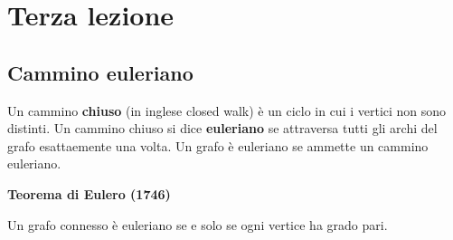 \documentclass[12pt]{report}
\begin{document}
\chapter{Terza lezione}

\section{Cammino euleriano}

\noindent
Un cammino \textbf{chiuso} (in inglese closed walk) è un ciclo in cui i vertici non sono distinti. Un cammino chiuso si dice \textbf{euleriano} se attraversa tutti gli archi del grafo esattaemente una volta. Un grafo è euleriano se ammette un cammino euleriano.

\begin{teo} \textbf{Teorema di Eulero (1746)}

\noindent 
Un grafo connesso è euleriano se e solo se ogni vertice ha grado pari.
\end{teo}
\end{document}
